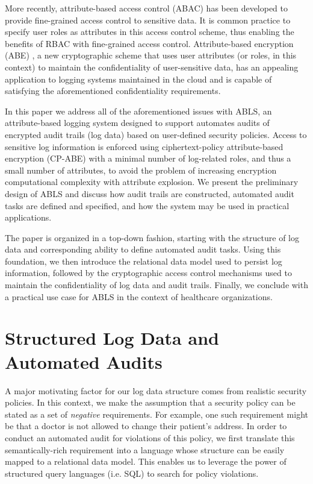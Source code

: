 \documentclass{sig-alternate}
\begin{document}
More recently, attribute-based access control (ABAC) \cite{TODOTODO} has been developed to 
provide fine-grained access control to sensitive data. It is common practice to specify user roles as attributes
in this access control scheme, thus enabling the benefits of RBAC with fine-grained access control.
Attribute-based encryption (ABE) \cite{Goyal2006-ABAC}, a new cryptographic scheme that uses 
user attributes (or roles, in this context) to maintain the confidentiality of user-sensitive data, has an appealing application
to logging systems maintained in the cloud and is capable of satisfying the aforementioned confidentiality 
requirements. 

In this paper we address all of the aforementioned issues with ABLS, an attribute-based logging system designed
to support automates audits of encrypted audit trails (log data) based on user-defined security policies. Access to
sensitive log information is enforced using ciphertext-policy attribute-based encryption (CP-ABE) with a minimal number
of log-related roles, and thus a small number of attributes, to avoid the problem of increasing encryption computational
complexity with attribute explosion. We present the preliminary design of ABLS and discuss how audit trails are 
constructed, automated audit tasks are defined and specified, and how the system may be used in practical applications.

The paper is organized in a top-down fashion, starting with the structure of log data and corresponding ability
to define automated audit tasks. Using this foundation, we then introduce the relational data model used to persist
log information, followed by the cryptographic access control mechanisms used to maintain the confidentiality
of log data and audit trails. Finally, we conclude with a practical use case for ABLS in the context of healthcare 
organizations.

\section{Structured Log Data and Automated Audits}
A major motivating factor for our log data structure comes from realistic security policies. In this context, we make
the assumption that a security policy can be stated as a set of \emph{negative} requirements. For example, one 
such requirement might be that a doctor is not allowed to change their patient's address. In order to conduct an 
automated audit for violations of this policy, we first translate this semantically-rich requirement into a language
whose structure can be easily mapped to a relational data model. This enables us to leverage the power of 
structured query languages (i.e. SQL) to search for policy violations.
\end{document}
